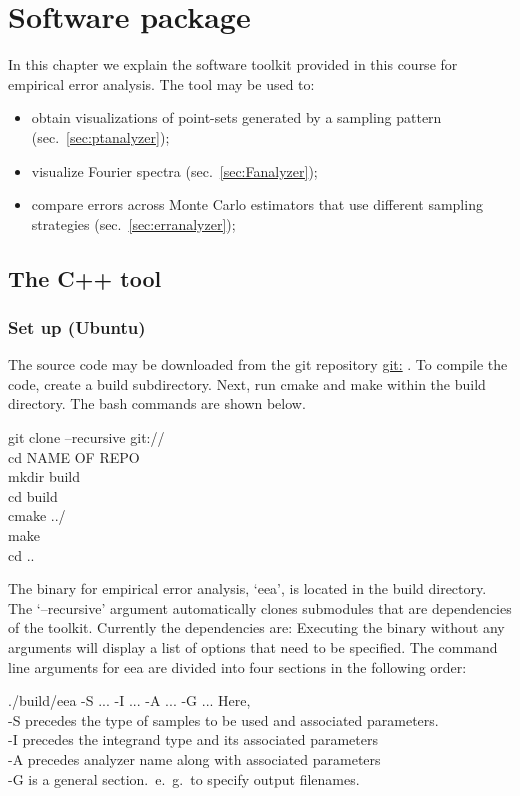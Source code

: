 
 \chapter{Software package}
In this chapter we explain the software toolkit provided in this course for empirical error analysis. The tool may be used to:
\begin{itemize}
 \item obtain visualizations of point-sets generated by a sampling pattern (sec.~\ref{sec:ptanalyzer});
 \item visualize Fourier spectra (sec.~\ref{sec:Fanalyzer}); 
 \item compare errors across Monte Carlo estimators that use different sampling strategies (sec.~\ref{sec:erranalyzer}); 
\end{itemize}

\section{The C++ tool}
\subsection{Set up (Ubuntu)}
The source code may be downloaded from the git repository \url{git:} .
 To compile the code, create a build subdirectory. Next, run cmake and make within the build directory. The bash commands are shown below. 
\begin{tcolorbox}
  git clone --recursive  git:// \\
  cd NAME OF REPO\\
  mkdir build\\
  cd build\\
  cmake ../ \\
  make\\
  cd ..\\
\end{tcolorbox}
The binary for empirical error analysis, `eea', is located in the build directory. The `--recursive' argument automatically clones submodules that are dependencies of the toolkit. Currently the dependencies are:  Executing the binary without any arguments will display a list of options that need to be specified. The command line arguments for eea are divided into four sections in the following order:
\begin{tcolorbox}
 ./build/eea -S  ... -I ... -A ... -G ...
\tcblower
Here, \\
-S precedes the type of samples to be used and associated parameters. \\
-I precedes the integrand type and its associated parameters \\
-A precedes analyzer name along with associated parameters \\
-G is a general section.~e.~g.~to specify output filenames.
\end{tcolorbox}

